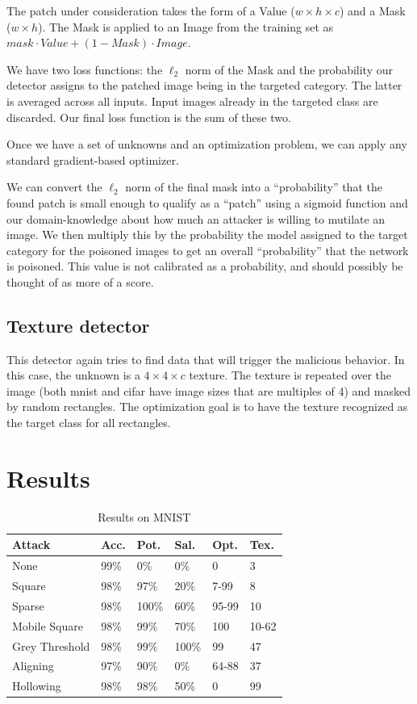 \documentclass[letterpaper, 10 pt, conference]{ieeeconf}  %
\begin{document}
The patch under consideration takes the form of a Value ($w \times h
\times c$) and a Mask ($w \times h$).  The Mask is applied to an
Image from the training set as $mask \cdot Value + (1 - Mask) \cdot
Image$.

We have two loss functions: the $\ell_2$ norm of the Mask and the
probability our detector assigns to the patched image being in the
targeted category.  The latter is averaged across all inputs.  Input
images already in the targeted class are discarded.  Our final loss
function is the sum of these two.

Once we have a set of unknowns and an optimization problem, we can
apply any standard gradient-based optimizer.

We can convert the $\ell_2$ norm of the final mask into a ``probability''
that the found patch is small enough to qualify as a ``patch'' using a
sigmoid function and our domain-knowledge about how much an attacker
is willing to mutilate an image.  We then multiply this by the
probability the model assigned to the target category for the poisoned
images to get an overall ``probability'' that the network is
poisoned.  This value is not calibrated as a probability, and should
possibly be thought of as more of a score.


\subsection{Texture detector}


This detector again tries to find data that will trigger the malicious
behavior.  In this case, the unknown is a $4\times 4\times c$ texture.  The
texture is repeated over the image (both mnist and cifar have image
sizes that are multiples of 4) and masked by random rectangles.  The
optimization goal is to have the texture recognized as the target
class for all rectangles.

\section{Results}

\begin{table}[b]
  \begin{tabular}{llllll}
    \hline
    Attack & Acc. & Pot. & Sal. & Opt. & Tex.\\
    \hline
    None & 99\% & 0\% & 0\% & 0 & 3\\
    Square & 98\% & 97\% & 20\% & 7-99 & 8\\
    Sparse & 98\% & 100\% & 60\% & 95-99 & 10\\
    Mobile Square & 98\% & 99\% & 70\% & 100 & 10-62\\
    Grey Threshold & 98\% & 99\% & 100\% & 99 & 47\\
    Aligning & 97\% & 90\% & 0\% & 64-88 & 37\\
    Hollowing & 98\% & 98\% & 50\% & 0 & 99\\
    \hline
  \end{tabular}
  \caption{Results on MNIST}
\end{table}
\end{document}
